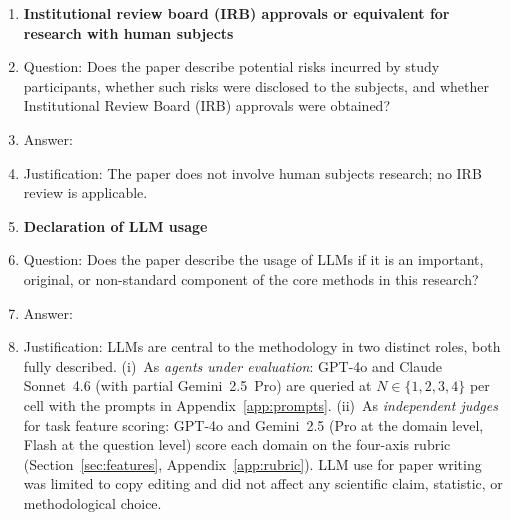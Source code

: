 \begin{enumerate}
\item {\bf Institutional review board (IRB) approvals or equivalent for research with human subjects}
    \item[] Question: Does the paper describe potential risks incurred by study participants, whether such risks were disclosed to the subjects, and whether Institutional Review Board (IRB) approvals were obtained?
    \item[] Answer: \answerNA{}
    \item[] Justification: The paper does not involve human subjects research; no IRB review is applicable.

\item {\bf Declaration of LLM usage}
    \item[] Question: Does the paper describe the usage of LLMs if it is an important, original, or non-standard component of the core methods in this research?
    \item[] Answer: \answerYes{}
    \item[] Justification: LLMs are central to the methodology in two distinct roles, both fully described. (i)~As \emph{agents under evaluation}: GPT-4o and Claude Sonnet~4.6 (with partial Gemini~2.5~Pro) are queried at $N{\in}\{1,2,3,4\}$ per cell with the prompts in Appendix~\ref{app:prompts}. (ii)~As \emph{independent judges} for task feature scoring: GPT-4o and Gemini~2.5 (Pro at the domain level, Flash at the question level) score each domain on the four-axis rubric (Section~\ref{sec:features}, Appendix~\ref{app:rubric}). LLM use for paper writing was limited to copy editing and did not affect any scientific claim, statistic, or methodological choice.

\end{enumerate}

